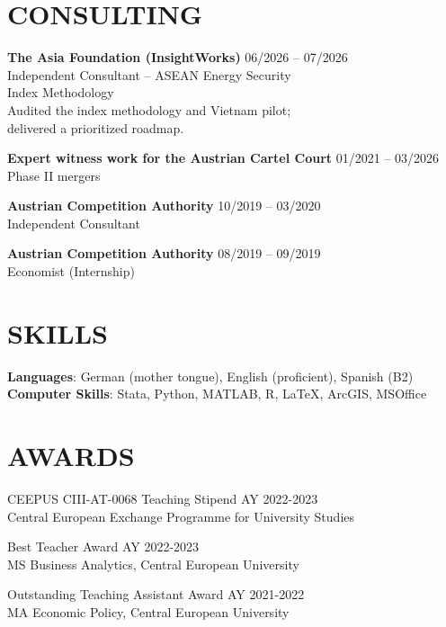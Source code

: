 \documentclass[margin]{res}
\begin{document}
\begin{resume}
\section{CONSULTING}
\textbf{The Asia Foundation (InsightWorks)} \hfill 06/2026 -- 07/2026\\
Independent Consultant -- ASEAN Energy Security\\
Index Methodology\\
Audited the index methodology and Vietnam pilot;\\
delivered a prioritized roadmap.
\par
\textbf{Expert witness work for the Austrian Cartel Court} \hfill 01/2021 -- 03/2026\\ Phase II mergers
\par
\textbf{Austrian Competition Authority} \hfill 10/2019 -- 03/2020\\ Independent Consultant
\par
\textbf{Austrian Competition Authority} \hfill 08/2019 -- 09/2019\\ Economist (Internship) 
\par




\section{SKILLS}

\textbf{Languages}: German (mother tongue), English (proficient), Spanish (B2)
\newline
\textbf{Computer Skills}: Stata, Python, MATLAB, R, \LaTeX, ArcGIS, MSOffice

\section{AWARDS}
CEEPUS  CIII-AT-0068 Teaching Stipend \hfill AY 2022-2023 \\
Central European Exchange Programme for University Studies
\par
Best Teacher Award \hfill AY 2022-2023 \\
MS Business Analytics, Central European University
\par
Outstanding Teaching Assistant Award \hfill AY 2021-2022 \\
MA Economic Policy, Central European University
\par


\end{resume}
\end{document}
